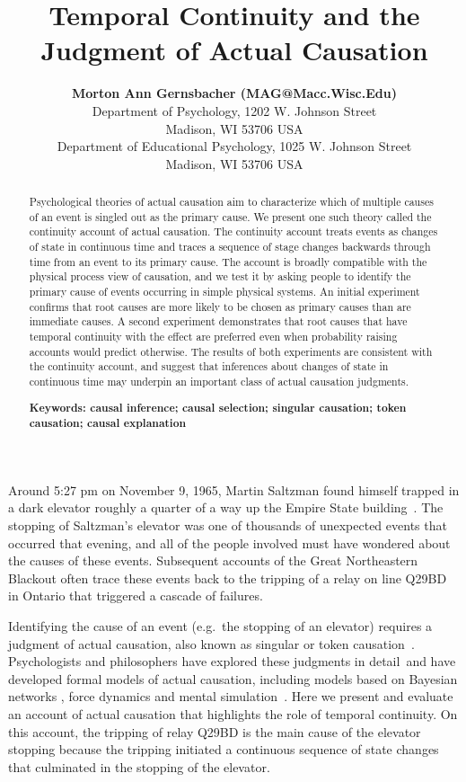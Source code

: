 \documentclass[10pt,letterpaper]{article}
\title{Temporal Continuity and the Judgment of Actual Causation}
\author{{\large \bf Morton Ann Gernsbacher (MAG@Macc.Wisc.Edu)} \\
  Department of Psychology, 1202 W. Johnson Street \\
  Madison, WI 53706 USA
  \AND {\large \bf Sharon J.~Derry (SDJ@Macc.Wisc.Edu)} \\
  Department of Educational Psychology, 1025 W. Johnson Street \\
  Madison, WI 53706 USA}
\begin{document}
\maketitle


\begin{abstract}

Psychological theories of actual causation aim to characterize which of multiple causes of an event is singled out as the primary cause. We present one such theory called the continuity account of actual causation. The continuity account treats events as changes of state in continuous time and traces a sequence of stage changes backwards through time from an event to its primary cause. The account is broadly compatible with the physical process view of causation, and we test it by asking people to identify the primary cause of events occurring in simple physical systems. An initial experiment confirms that root causes are more likely to be chosen as primary causes than are immediate causes. A second experiment demonstrates that root causes that have temporal continuity with the effect are preferred even when probability raising accounts would predict otherwise. The results of both experiments are consistent with the continuity account, and suggest that inferences about changes of state in continuous time may underpin an important class of actual causation judgments.  

\textbf{Keywords: causal inference; causal selection; singular causation; token causation; causal explanation} 
\end{abstract}


Around 5:27 pm on November 9, 1965, Martin Saltzman found himself trapped in a dark elevator roughly a quarter of a way up the Empire State building~\cite{gelbr1965night}. The stopping of Saltzman's elevator was one of thousands of unexpected events that occurred that evening, and all of the people involved must have wondered about the causes of these events. Subsequent accounts of the Great Northeastern Blackout often trace these events back to the tripping of a relay on line Q29BD in Ontario that triggered a cascade of failures.

Identifying the cause of an event (e.g.\ the stopping of an elevator) requires a judgment of actual causation, also known as singular or token causation~\cite{danks17}. Psychologists and philosophers have explored these judgments in detail~and have developed formal models of actual causation, including models based on Bayesian networks \cite{halpern16}, force dynamics \cite{wolfft17} and mental simulation~\cite{gerstenberg20}.  Here we present and evaluate an account of actual causation that highlights the role of temporal continuity.  On this account, the tripping of relay Q29BD is the main cause of the elevator stopping because the tripping initiated a continuous sequence of state changes that culminated in the stopping of the elevator.
\end{document}
